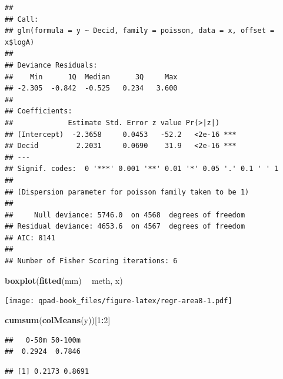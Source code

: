 \documentclass[12pt,]{book}
\newenvironment{Shaded}{\begin{snugshade}}{\end{snugshade}}
\newcommand{\CommentTok}[1]{\textcolor[rgb]{0.56,0.35,0.01}{\textit{#1}}}
\newcommand{\DecValTok}[1]{\textcolor[rgb]{0.00,0.00,0.81}{#1}}
\newcommand{\FloatTok}[1]{\textcolor[rgb]{0.00,0.00,0.81}{#1}}
\newcommand{\KeywordTok}[1]{\textcolor[rgb]{0.13,0.29,0.53}{\textbf{#1}}}
\newcommand{\NormalTok}[1]{#1}
\newcommand{\OperatorTok}[1]{\textcolor[rgb]{0.81,0.36,0.00}{\textbf{#1}}}
\newcommand{\StringTok}[1]{\textcolor[rgb]{0.31,0.60,0.02}{#1}}
\begin{document}
\begin{verbatim}
## 
## Call:
## glm(formula = y ~ Decid, family = poisson, data = x, offset = x$logA)
## 
## Deviance Residuals: 
##    Min      1Q  Median      3Q     Max  
## -2.305  -0.842  -0.525   0.234   3.600  
## 
## Coefficients:
##             Estimate Std. Error z value Pr(>|z|)    
## (Intercept)  -2.3658     0.0453   -52.2   <2e-16 ***
## Decid         2.2031     0.0690    31.9   <2e-16 ***
## ---
## Signif. codes:  0 '***' 0.001 '**' 0.01 '*' 0.05 '.' 0.1 ' ' 1
## 
## (Dispersion parameter for poisson family taken to be 1)
## 
##     Null deviance: 5746.0  on 4568  degrees of freedom
## Residual deviance: 4653.6  on 4567  degrees of freedom
## AIC: 8141
## 
## Number of Fisher Scoring iterations: 6
\end{verbatim}

\begin{Shaded}
\begin{Highlighting}[]
\KeywordTok{boxplot}\NormalTok{(}\KeywordTok{fitted}\NormalTok{(mm) }\OperatorTok{~}\StringTok{ }\NormalTok{meth, x)}
\end{Highlighting}
\end{Shaded}

\texttt{[image: qpad-book\_files/figure-latex/regr-area8-1.pdf]}

\begin{Shaded}
\begin{Highlighting}[]
\KeywordTok{cumsum}\NormalTok{(}\KeywordTok{colMeans}\NormalTok{(y))[}\DecValTok{1}\OperatorTok{:}\DecValTok{2}\NormalTok{]}
\end{Highlighting}
\end{Shaded}

\begin{verbatim}
##   0-50m 50-100m 
##  0.2924  0.7846
\end{verbatim}

\begin{Shaded}
\end{Shaded}

\begin{verbatim}
## [1] 0.2173 0.8691
\end{verbatim}
\end{document}
